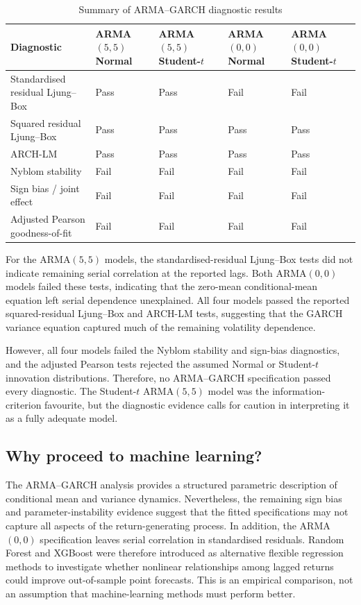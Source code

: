 \documentclass[10pt,a4paper]{article}
\begin{document}
\begin{table}[H]
\centering
\caption{Summary of ARMA--GARCH diagnostic results}
\small
\begin{tabularx}{\textwidth}{p{}XXXX}
\toprule
Diagnostic & ARMA$(5,5)$ Normal & ARMA$(5,5)$ Student-$t$ & ARMA$(0,0)$ Normal & ARMA$(0,0)$ Student-$t$ \\
\midrule
Standardised residual Ljung--Box & Pass & Pass & Fail & Fail \\
Squared residual Ljung--Box & Pass & Pass & Pass & Pass \\
ARCH-LM & Pass & Pass & Pass & Pass \\
Nyblom stability & Fail & Fail & Fail & Fail \\
Sign bias / joint effect & Fail & Fail & Fail & Fail \\
Adjusted Pearson goodness-of-fit & Fail & Fail & Fail & Fail \\
\bottomrule
\end{tabularx}
\label{tab:garch_diagnostics}
\end{table}

For the ARMA$(5,5)$ models, the standardised-residual Ljung--Box tests did not indicate remaining serial correlation at the reported lags. Both ARMA$(0,0)$ models failed these tests, indicating that the zero-mean conditional-mean equation left serial dependence unexplained. All four models passed the reported squared-residual Ljung--Box and ARCH-LM tests, suggesting that the GARCH variance equation captured much of the remaining volatility dependence.

However, all four models failed the Nyblom stability and sign-bias diagnostics, and the adjusted Pearson tests rejected the assumed Normal or Student-$t$ innovation distributions. Therefore, no ARMA--GARCH specification passed every diagnostic. The Student-$t$ ARMA$(5,5)$ model was the information-criterion favourite, but the diagnostic evidence calls for caution in interpreting it as a fully adequate model.

\subsection{Why proceed to machine learning?}

The ARMA--GARCH analysis provides a structured parametric description of conditional mean and variance dynamics. Nevertheless, the remaining sign bias and parameter-instability evidence suggest that the fitted specifications may not capture all aspects of the return-generating process. In addition, the ARMA$(0,0)$ specification leaves serial correlation in standardised residuals. Random Forest and XGBoost were therefore introduced as alternative flexible regression methods to investigate whether nonlinear relationships among lagged returns could improve out-of-sample point forecasts. This is an empirical comparison, not an assumption that machine-learning methods must perform better.
\end{document}
